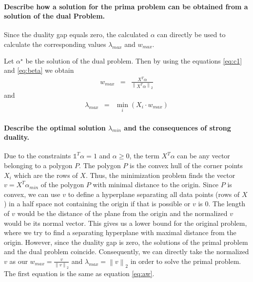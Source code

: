 \documentclass[a4paper, 11pt, titlepage]{article}
\newcommand{\norm}[1]{\left\lVert#1\right\rVert}
\begin{document}
\paragraph{Describe how a solution for the prima problem can be obtained from a solution of the dual Problem.}

Since the duality gap equals zero, the calculated $\alpha$ can directly be used to calculate the corresponding values $\lambda_{max}$ and $w_{max}$.

Let $\alpha^\star$ be the solution of the dual problem.
Then by using the equations \eqref{eq:c1} and \eqref{eq:beta} we obtain
\begin{eqnarray}
	w_{max} &=& \frac{X^T\alpha}{\norm{X^T\alpha}_2} \label{eq:aw}
\end{eqnarray}
and
\begin{eqnarray*}
	\lambda_{max} &=& \min_{i}\left( X_i \cdot w_{max} \right)
\end{eqnarray*}

\paragraph{Describe the optimal solution $\lambda_{min}$ and the consequences of strong duality.}

Due to the constraints $\mathds{1}^T\alpha=1$ and $\alpha \ge 0$, the term $X^T\alpha$ can be any vector belonging to a polygon $P$.
The polygon $P$ is the convex hull of the corner points $X_i$ which are the rows of $X$.
Thus, the minimization problem finds the vector $v=X^T\alpha_{min}$ of the polygon $P$ with minimal distance to the origin.
Since $P$ is convex, we can use $v$ to define a hyperplane separating all data points (rows of $X$) in a half space not containing the origin if that is possible or $v$ is 0.
The length of $v$ would be the distance of the plane from the origin and the normalized $v$ would be its normal vector.
This gives us a lower bound for the original problem, where we try to find a separating hyperplane with maximal distance from the origin.
However, since the duality gap is zero, the solutions of the primal problem and the dual problem coincide.
Consequently, we can directly take the normalized $v$ as our $w_{max}=\frac{v}{\norm{v}_2}$ and $\lambda_{max}=\norm{v}_2$ in order to solve the primal problem.
The first equation is the same as equation \eqref{eq:aw}.
\end{document}
